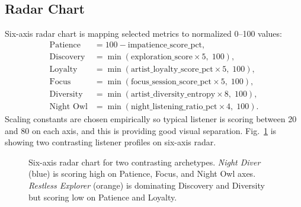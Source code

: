 \documentclass[conference]{IEEEtran}
\begin{document}
\subsection{Radar Chart}

Six-axis radar chart is mapping selected metrics to normalized 0--100 values:
\begin{align*}
  \text{Patience}   &= 100 - \text{impatience\_score\_pct}, \\
  \text{Discovery}  &= \min(\text{exploration\_score} \times 5,\; 100), \\
  \text{Loyalty}    &= \min(\text{artist\_loyalty\_score\_pct} \times 5,\; 100), \\
  \text{Focus}      &= \min(\text{focus\_session\_score\_pct} \times 5,\; 100), \\
  \text{Diversity}  &= \min(\text{artist\_diversity\_entropy} \times 8,\; 100), \\
  \text{Night Owl}  &= \min(\text{night\_listening\_ratio\_pct} \times 4,\; 100).
\end{align*}
Scaling constants are chosen empirically so typical listener is scoring between 20 and 80 on each axis, and this is providing good visual separation. Fig.~\ref{fig:radar} is showing two contrasting listener profiles on six-axis radar.

\begin{figure}[ht]
\centering
{}
\caption{Six-axis radar chart for two contrasting archetypes. \textit{Night
Diver} (blue) is scoring high on Patience, Focus, and Night Owl axes.
\textit{Restless Explorer} (orange) is dominating Discovery and Diversity
but scoring low on Patience and Loyalty.}
\label{fig:radar}
\end{figure}
\end{document}
